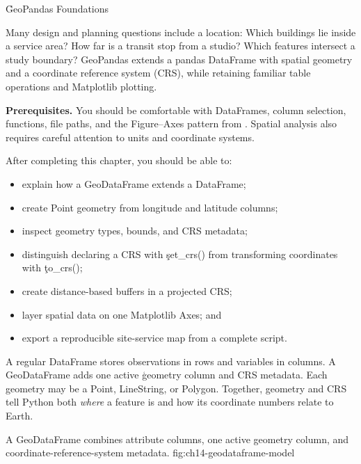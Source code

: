 
\h{GeoPandas Foundations}
\label{ch:14}

Many design and planning questions include a location: Which buildings lie
inside a service area? How far is a transit stop from a studio? Which features
intersect a study boundary? GeoPandas extends a pandas DataFrame with spatial
geometry and a coordinate reference system (CRS), while retaining familiar
table operations and Matplotlib plotting.

\begin{NoteBox}
\textbf{Prerequisites.} You should be comfortable with DataFrames, column
selection, functions, file paths, and the Figure--Axes pattern from
. Spatial analysis also requires careful attention
to units and coordinate systems.
\end{NoteBox}

\begin{tcolorbox}[title=Learning outcomes,colframe=orange,colback=white,arc=2mm]
After completing this chapter, you should be able to:
\begin{itemize}
    \item explain how a GeoDataFrame extends a DataFrame;
    \item create Point geometry from longitude and latitude columns;
    \item inspect geometry types, bounds, and CRS metadata;
    \item distinguish declaring a CRS with \c{set_crs()} from transforming
          coordinates with \c{to_crs()};
    \item create distance-based buffers in a projected CRS;
    \item layer spatial data on one Matplotlib Axes; and
    \item export a reproducible site-service map from a complete script.
\end{itemize}
\end{tcolorbox}


A regular DataFrame stores observations in rows and variables in columns. A
GeoDataFrame adds one active \c{geometry} column and CRS metadata. Each geometry
may be a Point, LineString, or Polygon. Together, geometry and CRS tell Python
both \emph{where} a feature is and how its coordinate numbers relate to Earth.

{A GeoDataFrame combines attribute columns, one active geometry column, and coordinate-reference-system metadata.}
{fig:ch14-geodataframe-model}

